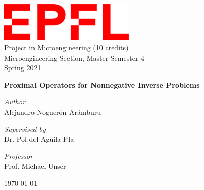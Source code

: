\documentclass[11pt]{article}
\begin{document}
% 
\renewcommand{\headrulewidth}{1pt}
\fancyhead[R]{\today}
\renewcommand{\footrulewidth}{1pt}
\fancyfoot[R]{\thepage/\pageref{LastPage}}
\setlength{\parskip}{0.7em}

\begin{titlepage}		%
\begin{center} 	

\includegraphics[width=6.5cm]{images/EPFL_Logo.png}	\\[1cm]
\LARGE Project in Microengineering (10 credits)\\ Microengineering Section, Master Semester 4 \\ Spring 2021


\vspace*{\fill}

\Huge {\bfseries Proximal Operators for Nonnegative Inverse Problems }\\[0.5cm]

\vspace{20pt}


\LARGE {\emph{Author}}\\ Alejandro Noguerón Arámburu\\ 


\vspace{10pt}

\LARGE {\emph{Supervised by}}\\ Dr. Pol del Aguila Pla \\ 


\vspace{10pt}

\LARGE {\emph{Professor}}\\ Prof. Michael Unser \\ 




\vspace*{\fill}

\today
\end{center}
\end{titlepage}
\end{document}
